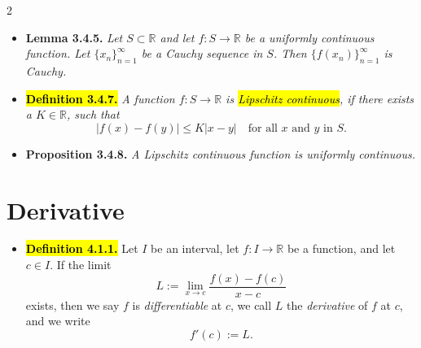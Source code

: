 \documentclass[a4paper,10pt]{article}
\begin{document}
\begin{multicols}{2}
\begin{itemize}
    \item \textbf{Lemma 3.4.5.} \textit{Let \( S \subset \mathbb{R} \) and let \( f : S \to \mathbb{R} \) be a uniformly continuous function. Let \( \{x_n\}_{n=1}^{\infty} \) be a Cauchy sequence in \( S \). Then \( \{f(x_n)\}_{n=1}^{\infty} \) is Cauchy.}
    \item \hl{\textbf{Definition 3.4.7.}} \textit{A function \( f : S \to \mathbb{R} \) is \hl{\textit{Lipschitz continuous}}, if there exists a \( K \in \mathbb{R} \), such that}
    \[
    |f(x) - f(y)| \leq K |x - y| \quad \text{for all } x \text{ and } y \text{ in } S.
    \]
    \item \textbf{Proposition 3.4.8.} \textit{A Lipschitz continuous function is uniformly continuous.}
\end{itemize}

\section*{Derivative}
\begin{itemize}
    \item \hl{\textbf{Definition 4.1.1.}} Let \( I \) be an interval, let \( f : I \to \mathbb{R} \) be a function, and let \( c \in I \). If the limit
    \[
    L := \lim_{x \to c} \frac{f(x) - f(c)}{x - c}
    \]
    exists, then we say \( f \) is \textit{differentiable} at \( c \), we call \( L \) the \textit{derivative} of \( f \) at \( c \), and we write
    \[
    f'(c) := L.
    \]
    

\end{itemize}
\end{multicols}
\end{document}
